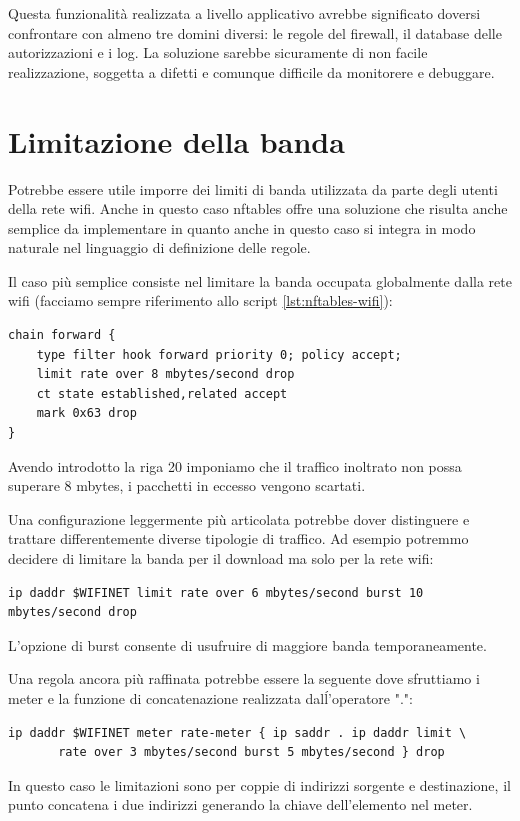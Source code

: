 Questa funzionalit\`a realizzata a livello applicativo avrebbe significato
doversi confrontare con almeno tre domini diversi: le regole del firewall, il
database delle autorizzazioni e i log. La soluzione sarebbe sicuramente di non
facile realizzazione, soggetta a difetti e comunque difficile da monitorere e
debuggare.
\section{Limitazione della banda}
Potrebbe essere utile imporre dei limiti di banda utilizzata da parte degli
utenti della rete wifi. Anche in questo caso nftables offre una soluzione che
risulta anche semplice da implementare in quanto anche in questo caso si integra in modo naturale nel
linguaggio di definizione delle regole.

Il caso pi\`u semplice consiste nel limitare la banda occupata globalmente
dalla rete wifi (facciamo sempre riferimento allo script \ref{lst:nftables-wifi}):

\begin{lstlisting}[style=customc,firstnumber=18]
chain forward {
    type filter hook forward priority 0; policy accept;
    limit rate over 8 mbytes/second drop
    ct state established,related accept
    mark 0x63 drop
}
\end{lstlisting}
Avendo introdotto la riga 20 imponiamo che il traffico inoltrato non possa
superare 8 mbytes, i pacchetti in eccesso vengono scartati.

Una configurazione leggermente pi\`u articolata potrebbe dover distinguere e
trattare differentemente diverse tipologie di traffico. Ad esempio potremmo
decidere di limitare la banda per il download ma solo per la rete wifi:
\begin{lstlisting}[style=customc,firstnumber=20]
ip daddr $WIFINET limit rate over 6 mbytes/second burst 10 mbytes/second drop
\end{lstlisting}
L'opzione di burst consente di usufruire di maggiore banda temporaneamente.

Una regola ancora pi\`u raffinata potrebbe essere la seguente dove sfruttiamo
i meter e la funzione di concatenazione realizzata dalĺ'operatore ".":
\begin{lstlisting}[style=customc,firstnumber=20]
ip daddr $WIFINET meter rate-meter { ip saddr . ip daddr limit \
       rate over 3 mbytes/second burst 5 mbytes/second } drop
\end{lstlisting}
In questo caso le limitazioni sono per coppie di indirizzi sorgente e destinazione,
il punto concatena i due indirizzi generando la chiave dell'elemento nel meter.

